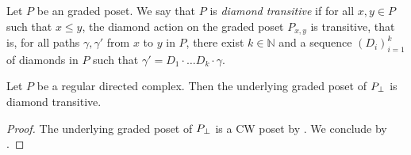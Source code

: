 \begin{dfn} 
    Let \( P \) be an graded poset.
    We say that \( P \) is \emph{diamond transitive} if for all \( x, y \in P \) such that \( x \le y \), the diamond action on the graded poset \( P_{x, y} \) is transitive, that is, for all paths \( \gamma, \gamma' \) from \( x \) to \( y \) in \( P \), there exist \( k \in \mathbb{N} \) and a sequence \( (D_i)_{i = 1}^k \) of diamonds in \( P \) such that \( \gamma' = D_1 \cdot \ldots D_k \cdot \gamma \).
\end{dfn}

\begin{lem} \label{lem:diamond_transitive}
    Let \( P \) be a regular directed complex.
    Then the underlying graded poset of \( {{P}_\bot} \) is diamond transitive.
\end{lem}
\begin{proof}
    The underlying graded poset of \( {{P}_\bot} \) is a CW poset by \cite[Corollary 10.3.3]{hadzihasanovic2024combinatorics}.
    We conclude by \cite[Theorem 5.14]{chandler2019thin}.
\end{proof}

